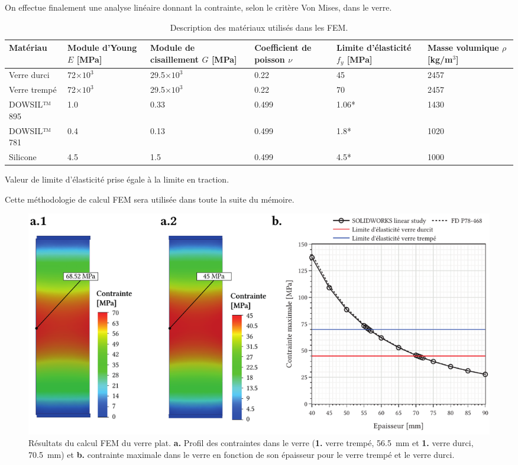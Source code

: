 \documentclass[11pt,titlepage]{article}
\begin{document}
On effectue finalement une analyse linéaire donnant la contrainte, selon le critère Von Mises, dans le verre. 

\begin{table}[H]
\begin{center}
\caption{Description des matériaux utilisés dans les \acrshort{FEM}.}
\label{tab:mat_autoportant}
\begin{tabularx}{\textwidth}{l*{5}{Y}}
\toprule
\textbf{Matériau} & \textbf{Module d'Young} $E$ [MPa] & \textbf{Module de cisaillement} $G$ [MPa]&\textbf{Coefficient de poisson} $\nu$ & \textbf{Limite d'élasticité} $f_y$ [MPa]& \textbf{Masse volumique} $\rho$ [kg/m$^3$] \\\midrule
Verre durci & 72$\times 10^3$ & 29.5$\times 10^3$ & 0.22 &45 & 2457 \\
Verre trempé & 72$\times 10^3$ & 29.5$\times 10^3$ & 0.22 &70 & 2457 \\
DOWSIL™ 895 & 1.0 & 0.33 & 0.499 & 1.06* & 1430 \\
DOWSIL™ 781 & 0.4 & 0.13 & 0.499 & 1.8* & 1020 \\
Silicone & 4.5 & 1.5 & 0.499 & 4.5* & 1000\\
\bottomrule
\end{tabularx}
\end{center}
{\RaggedLeft \footnotesize * Valeur de limite d'élasticité prise égale à la limite en traction.}\end{table}

Cette méthodologie de calcul \acrshort{FEM} sera utilisée dans toute la suite du mémoire.

\begin{figure}[H]
    \centering
    \includegraphics[width=\textwidth]{img/plat/dim_fem.pdf}
    \caption{Résultats du calcul \acrshort{FEM} du verre plat. \textbf{a.} Profil des contraintes dans le verre (\textbf{1.} verre trempé, \qty{56.5}{\milli\meter} et \textbf{1.} verre durci, \qty{70.5}{\milli\meter}) et \textbf{b.} contrainte maximale dans le verre en fonction de son épaisseur pour le verre trempé et le verre durci.}
    \label{fig:fem_plat_dim}
\end{figure}
\end{document}
